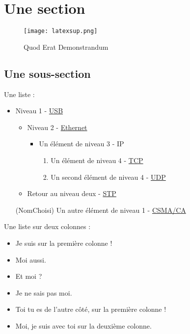 \section{Une section}

\begin{figure}[H]
    \centering
    \texttt{[image: latexsup.png]}
    \caption{Quod Erat Demonstrandum}
\end{figure}

\FloatBarrier

\clearpage

\subsection{Une sous-section}

Une liste :
\begin{itemize} %
    \item Niveau 1 - \href{https://fr.wikipedia.org/wiki/USB}{USB}
    \begin{itemize}
        \item Niveau 2 - \href{https://fr.wikipedia.org/wiki/Ethernet}{Ethernet}
        \begin{itemize}
            \item Un élément de niveau 3 - IP
            \begin{enumerate} %
                \item Un élément de niveau 4 - \href{https://en.wikipedia.org/wiki/TCP}{TCP}
                \item Un second élément de niveau 4 - \href{https://en.wikipedia.org/wiki/UDP}{UDP}
            \end{enumerate}
        \end{itemize}
        \item Retour au niveau deux - \href{https://fr.wikipedia.org/wiki/Spanning_Tree_Protocol}{STP}
    \end{itemize}
    \item[(NomChoisi)] Un autre élément de niveau 1 - \href{https://fr.wikipedia.org/wiki/Carrier_Sense_Multiple_Access_with_Collision_Avoidance}{CSMA/CA}
\end{itemize}

Une liste sur deux colonnes :
\begin{itemize}[twocol]
    \item Je suis sur la première colonne !
    \item Moi aussi.
    \item Et moi ?
    \item Je ne sais pas moi.
    \item Toi tu es de l'autre côté, sur la première colonne !
    \item Moi, je suis avec toi sur la deuxième colonne.
\end{itemize}


